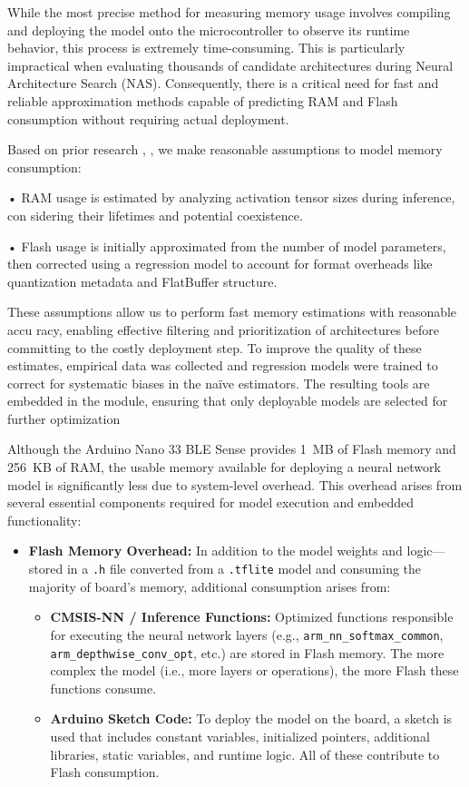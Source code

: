 While the most precise method for measuring memory usage involves compiling and deploying the model onto the microcontroller to observe its runtime behavior, this process is extremely time-consuming. This is particularly impractical when evaluating thousands of candidate architectures during Neural Architecture Search (NAS). Consequently, there is a critical need for fast and reliable approximation methods capable of predicting RAM and Flash consumption without requiring actual deployment.


Based on prior research \cite{tensorflow_RamEstimation}, \cite{liberis2019neural} , we make reasonable assumptions to model
memory consumption:

• RAM usage is estimated by analyzing activation tensor sizes during inference, con
sidering their lifetimes and potential coexistence.

• Flash usage is initially approximated from the number of model parameters, then
corrected using a regression model to account for format overheads like quantization
metadata and FlatBuffer structure.

These assumptions allow us to perform fast memory estimations with reasonable accu
racy, enabling effective filtering and prioritization of architectures before committing to
the costly deployment step. To improve the quality of these estimates, empirical data
was collected and regression models were trained to correct for systematic biases in the
naïve estimators. The resulting tools are embedded in the module, ensuring that only
deployable models are selected for further optimization

Although the Arduino Nano 33 BLE Sense provides 1~MB of Flash memory and 256~KB of RAM, the usable memory available for deploying a neural network model is significantly less due to system-level overhead. This overhead arises from several essential components required for model execution and embedded functionality:

\begin{itemize}
    \item \textbf{Flash Memory Overhead:} In addition to the model weights and logic—stored in a \texttt{.h} file converted from a \texttt{.tflite} model and consuming the majority of board's memory, additional consumption arises from:
    \begin{itemize}
        \item \textbf{CMSIS-NN / Inference Functions:} Optimized functions responsible for executing the neural network layers (e.g., \texttt{arm\_nn\_softmax\_common}, \texttt{arm\_depthwise\_conv\_opt}, etc.) are stored in Flash memory. The more complex the model (i.e., more layers or operations), the more Flash these functions consume.
        \item \textbf{Arduino Sketch Code:} To deploy the model on the board, a sketch is used that includes constant variables, initialized pointers, additional libraries, static variables, and runtime logic. All of these contribute to Flash consumption.
    \end{itemize}
\end{itemize}


